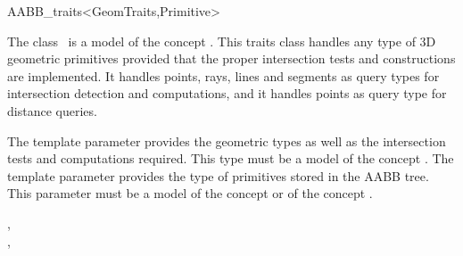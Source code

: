 \ccRefPageBegin


\begin{ccRefClass}{AABB_traits<GeomTraits,Primitive>}


\ccDefinition
  
The class \ccRefName\ is a model of the concept . This traits class handles any type of 3D geometric primitives provided that the proper intersection tests and constructions are implemented. It handles points, rays, lines and segments as query types for intersection detection and computations, and it handles points as query type for distance queries. 

\ccParameters
The template parameter  provides the geometric types as well as the intersection tests and computations required. This type must be a model of the concept . The template parameter  provides the type of primitives stored in the AABB tree. This parameter must be a model of the concept  or of the concept .


\ccTypes

\ccGlue
{}
\ccGlue
{}
\ccGlue
{}
\ccGlue
{}
\ccGlue
{}
\ccGlue
{}

{} 


\ccSeeAlso

,\\
, \\
\\
\\


\end{ccRefClass}

\ccRefPageEnd

